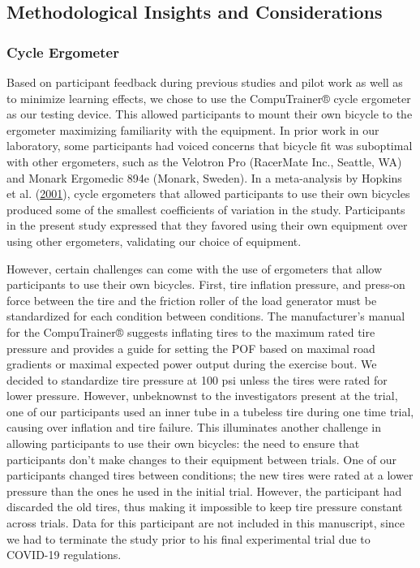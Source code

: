 \documentclass[]{cik}%
\begin{document}
\hypertarget{methodological-insights-and-considerations}{%
\subsection{Methodological Insights and
Considerations}\label{methodological-insights-and-considerations}}

\hypertarget{cycle-ergometer}{%
\subsubsection{Cycle Ergometer}\label{cycle-ergometer}}

Based on participant feedback during previous studies and pilot work as
well as to minimize learning effects, we chose to use the CompuTrainer®
cycle ergometer as our testing device. This allowed participants to
mount their own bicycle to the ergometer maximizing familiarity with the
equipment. In prior work in our laboratory, some participants had voiced
concerns that bicycle fit was suboptimal with other ergometers, such as
the Velotron Pro (RacerMate Inc., Seattle, WA) and Monark Ergomedic 894e
(Monark, Sweden). In a meta-analysis by Hopkins et al.
(\protect\hyperlink{ref-53}{2001}), cycle ergometers that allowed
participants to use their own bicycles produced some of the smallest
coefficients of variation in the study. Participants in the present
study expressed that they favored using their own equipment over using
other ergometers, validating our choice of equipment.

However, certain challenges can come with the use of ergometers that
allow participants to use their own bicycles. First, tire inflation
pressure, and press-on force between the tire and the friction roller of
the load generator must be standardized for each condition between
conditions. The manufacturer's manual for the CompuTrainer® suggests
inflating tires to the maximum rated tire pressure and provides a guide
for setting the POF based on maximal road gradients or maximal expected
power output during the exercise bout. We decided to standardize tire
pressure at 100 psi unless the tires were rated for lower pressure.
However, unbeknownst to the investigators present at the trial, one of
our participants used an inner tube in a tubeless tire during one time
trial, causing over inflation and tire failure. This illuminates another
challenge in allowing participants to use their own bicycles: the need
to ensure that participants don't make changes to their equipment
between trials. One of our participants changed tires between
conditions; the new tires were rated at a lower pressure than the ones
he used in the initial trial. However, the participant had discarded the
old tires, thus making it impossible to keep tire pressure constant
across trials. Data for this participant are not included in this
manuscript, since we had to terminate the study prior to his final
experimental trial due to COVID-19 regulations.
\end{document}
